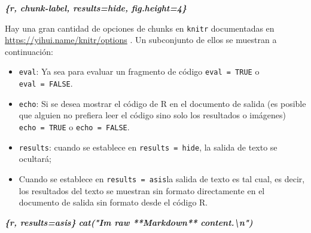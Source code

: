 \documentclass[
]{book}
\newenvironment{Shaded}{\begin{snugshade}}{\end{snugshade}}
\newcommand{\InformationTok}[1]{\textcolor[rgb]{0.56,0.35,0.01}{\textbf{\textit{#1}}}}
\providecommand{\tightlist}{%
  \setlength{\itemsep}{0pt}\setlength{\parskip}{0pt}}
\begin{document}
\begin{Shaded}
\begin{Highlighting}[]
\InformationTok{\textasciigrave{}\textasciigrave{}\textasciigrave{}\{r, chunk{-}label, results=\textquotesingle{}hide\textquotesingle{}, fig.height=4\}}
\end{Highlighting}
\end{Shaded}

Hay una gran cantidad de opciones de chunks en \texttt{knitr} documentadas en \url{https://yihui.name/knitr/options} .
Un subconjunto de ellos se muestran a continuación:

\begin{itemize}
\tightlist
\item
  \texttt{eval}: Ya sea para evaluar un fragmento de código \textbar{} \texttt{eval\ =\ TRUE} o \texttt{eval\ =\ FALSE}.\\
\item
  \texttt{echo}: Si se desea mostrar el código de R en el documento de salida (es posible que alguien no prefiera leer el código sino solo los resultados o imágenes) \textbar{} \texttt{echo\ =\ TRUE} o \texttt{echo\ =\ FALSE}.\\
\item
  \texttt{results}: cuando se establece en \texttt{results\ =\ \textquotesingle{}hide\textquotesingle{}}, la salida de texto se ocultará;\\
\item
  Cuando se establece en \texttt{results\ =\ \textquotesingle{}asis\textquotesingle{}}la salida de texto es tal cual, es decir, los resultados del texto se muestran sin formato directamente en el documento de salida sin formato desde el código R.
\end{itemize}

\begin{Shaded}
\begin{Highlighting}[]
\InformationTok{\textasciigrave{}\textasciigrave{}\textasciigrave{}\{r, results=\textquotesingle{}asis\textquotesingle{}\}}
\InformationTok{cat("I\textquotesingle{}m raw **Markdown** content.\textbackslash{}n")}
\InformationTok{\textasciigrave{}\textasciigrave{}\textasciigrave{}}
\end{Highlighting}
\end{Shaded}
\end{document}
